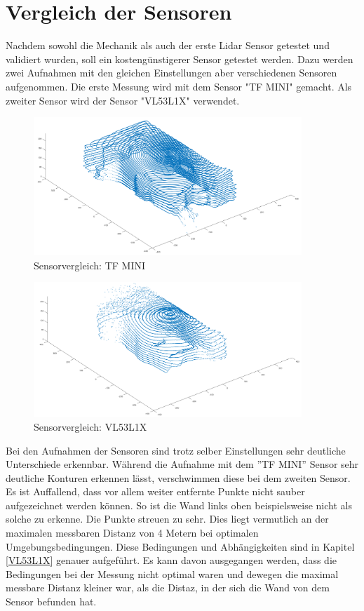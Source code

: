 \section{Vergleich der Sensoren}

Nachdem sowohl die Mechanik als auch der erste Lidar Sensor getestet und validiert wurden, soll ein kostengünstigerer Sensor getestet werden. Dazu werden zwei Aufnahmen mit den gleichen Einstellungen aber verschiedenen Sensoren aufgenommen. Die erste Messung wird mit dem Sensor "TF MINI" gemacht. Als zweiter Sensor wird der Sensor "VL53L1X" verwendet.

 

\begin{figure}[H]
	\centering
	\includegraphics[width=0.9\textwidth]{images/Validierung/Aufloesungen/mittel.png}
	\caption{Sensorvergleich: TF MINI}
	\label{hoch}
\end{figure}



\begin{figure}[H]
	\centering
	\includegraphics[width=0.9\textwidth]{images/Validierung/VL53.png}
	\caption{Sensorvergleich: VL53L1X}
	\label{vlx}
\end{figure}

Bei den Aufnahmen der Sensoren sind trotz selber Einstellungen sehr deutliche Unterschiede erkennbar. Während die Aufnahme mit dem ''TF MINI'' Sensor sehr deutliche Konturen erkennen lässt, verschwimmen diese bei dem zweiten Sensor. Es ist Auffallend, dass vor allem weiter entfernte Punkte nicht sauber aufgezeichnet werden können. So ist die Wand links oben beispielsweise nicht als solche zu erkenne. Die Punkte streuen zu sehr. Dies liegt vermutlich an der maximalen messbaren Distanz von 4 Metern bei optimalen Umgebungsbedingungen. Diese Bedingungen und Abhängigkeiten sind in Kapitel \ref{VL53L1X} genauer aufgeführt. Es kann davon ausgegangen werden, dass die Bedingungen bei der Messung nicht optimal waren und dewegen die maximal messbare Distanz kleiner war, als die Distaz, in der sich die Wand von dem Sensor befunden hat. 

